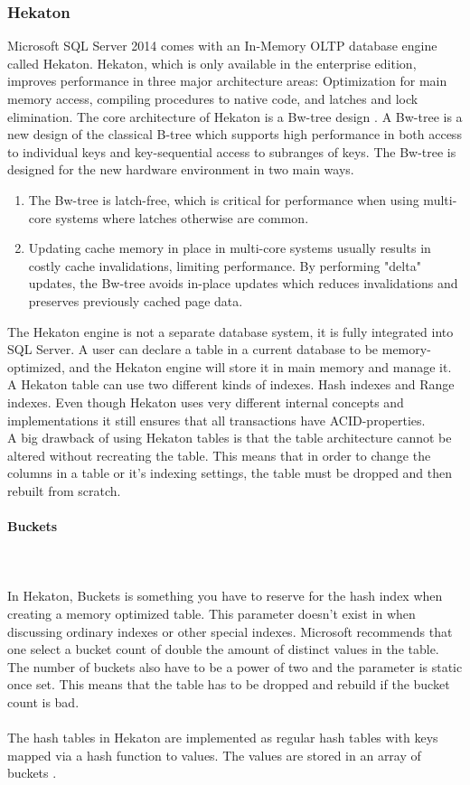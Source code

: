\documentclass{cslthse-msc}
\begin{document}
\subsubsection{Hekaton}
Microsoft SQL Server 2014 comes with an In-Memory OLTP database engine called Hekaton. Hekaton, which is only available in the enterprise edition, improves performance in three major architecture areas: Optimization for main memory access, compiling procedures to native code, and latches and lock elimination. The core architecture of Hekaton is a Bw-tree design   \cite{Levandoski14}. A Bw-tree is a new design of the classical B-tree which supports high performance in both access to individual keys and key-sequential access to subranges of keys. The Bw-tree is designed for the new hardware environment in two main ways. 
\begin{enumerate}
\item The Bw-tree is latch-free, which is critical for performance when using multi-core systems where latches otherwise are common.
\item Updating cache memory in place in multi-core systems usually results in costly cache invalidations, limiting performance. By performing "delta" updates, the Bw-tree avoids in-place updates which reduces invalidations and preserves previously cached page data.
\end{enumerate} 
The Hekaton engine is not a separate database system, it is fully integrated into SQL Server. A user can declare a table in a current database to be memory-optimized, and the Hekaton engine will store it in main memory and manage it. A Hekaton table can use two different kinds of indexes. Hash indexes and Range indexes.  Even though Hekaton uses very different internal concepts and implementations it still ensures that all transactions have ACID-properties. \\
A big drawback of using Hekaton tables is that the table architecture cannot be altered without recreating the table. This means that in order to change the columns in a table or it's indexing settings, the table must be dropped and then rebuilt from scratch.

\paragraph*{Buckets}\mbox{}\\\\
In Hekaton, Buckets is something you have to reserve for the hash index when creating a memory optimized table. This parameter doesn't exist in when discussing ordinary indexes or other special indexes. Microsoft recommends that one select a bucket count of double the amount of distinct values in the table. The number of buckets also have to be a power of two and the parameter is static once set. This means that the table has to be dropped and rebuild if the bucket count is bad. \\\\
The hash tables in Hekaton are implemented as regular hash tables with keys mapped via a hash function to values. The values are stored in an array of buckets   \cite{Barbarin14}. 
\end{document}
